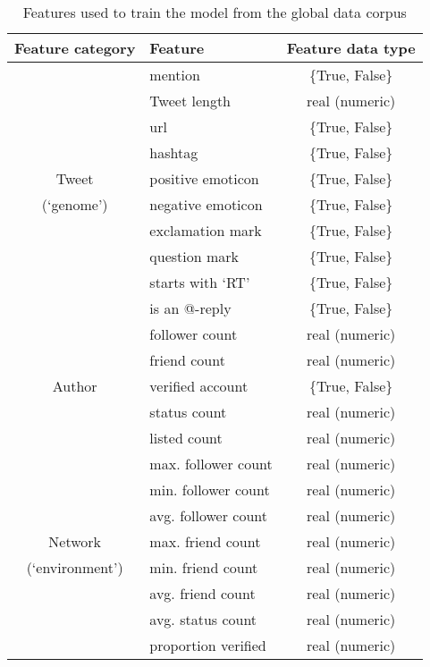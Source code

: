 \begin{enumerate}
\begin{table}[h]\footnotesize
\begin{center}
\begin{tabular}{ c | l | c }
	 Feature category	& Feature & Feature data type \\
	 \hline
	 \hline 
	& mention & \{True, False\}\\
    & Tweet length & real (numeric)\\
    & url & \{True, False\}\\
  	& hashtag & \{True, False\}\\
  	Tweet & positive emoticon & \{True, False\}\\
  	(`genome')& negative emoticon & \{True, False\}\\
  	& exclamation mark & \{True, False\}\\
  	& question mark & \{True, False\}\\
  	& starts with `RT' & \{True, False\}\\
  	& is an @-reply & \{True, False\}\\
  \hline                        
	& follower count & real (numeric)\\
    & friend count  & real (numeric)\\
	Author & verified account & \{True, False\}\\
	& status count & real (numeric)\\
	& listed count & real (numeric)\\
  \hline
  	&  max. follower count & real (numeric)\\
	&  min. follower count & real (numeric)\\
	&  avg. follower count & real (numeric)\\
    Network &  max. friend count & real (numeric)\\
	(`environment') &  min. friend count & real (numeric)\\
	&  avg. friend count & real (numeric)\\  
	&  avg. status count & real (numeric)\\  
  	& proportion verified & real (numeric)\\  
  \hline  
\end{tabular}
\end{center}
\caption{Features used to train the model from the global data corpus}
\label{table:globalfeatures}
\end{table}


\end{enumerate}
